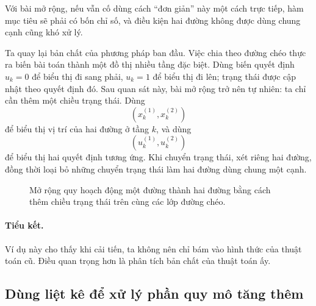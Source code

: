 \documentclass[11pt]{article}
\begin{document}
Với bài mở rộng, nếu vẫn cố dùng cách ``đơn giản'' này một cách trực tiếp, hàm
mục tiêu sẽ phải có bốn chỉ số, và điều kiện hai đường không được dùng chung
cạnh cũng khó xử lý.

Ta quay lại bản chất của phương pháp ban đầu. Việc chia theo đường chéo thực
ra biến bài toán thành một đồ thị nhiều tầng đặc biệt. Dùng biến quyết định
$u_k=0$ để biểu thị đi sang phải, $u_k=1$ để biểu thị đi lên; trạng thái được
cập nhật theo quyết định đó. Sau quan sát này, bài mở rộng trở nên tự nhiên:
ta chỉ cần thêm một chiều trạng thái. Dùng
\[
  (x_k^{(1)},x_k^{(2)})
\]
để biểu thị vị trí của hai đường ở tầng $k$, và dùng
\[
  (u_k^{(1)},u_k^{(2)})
\]
để biểu thị hai quyết định tương ứng. Khi chuyển trạng thái, xét riêng hai
đường, đồng thời loại bỏ những chuyển trạng thái làm hai đường dùng chung một
cạnh.

\begin{figure}[ht]
\centering
{}
\caption{Mở rộng quy hoạch động một đường thành hai đường bằng cách thêm chiều
trạng thái trên cùng các lớp đường chéo.}
\end{figure}

\paragraph{Tiểu kết.}
Ví dụ này cho thấy khi cải tiến, ta không nên chỉ bám vào hình thức của thuật
toán cũ. Điều quan trọng hơn là phân tích bản chất của thuật toán ấy.

\subsection{Dùng liệt kê để xử lý phần quy mô tăng thêm}
\end{document}

